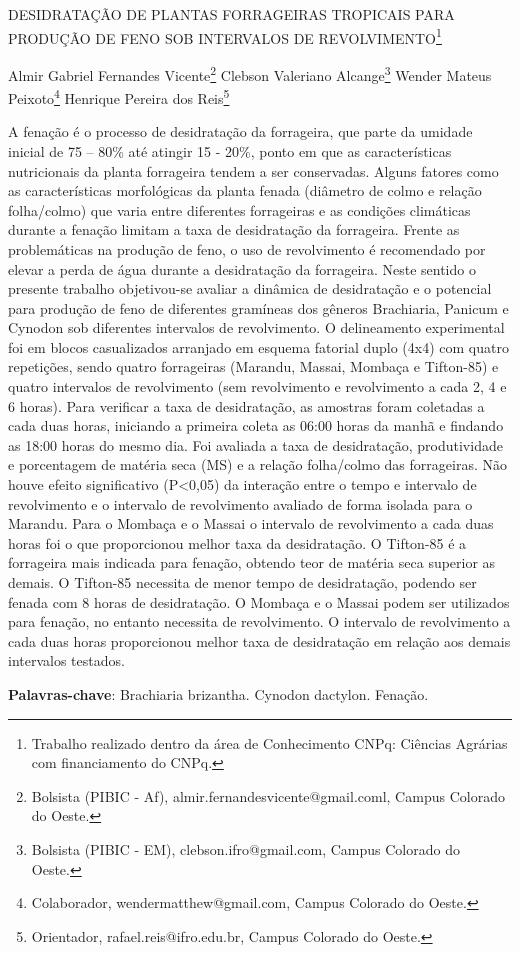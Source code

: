 \documentclass[article,12pt,onesidea,4paper,english,brazil]{abntex2}
\begin{document}
	
	
	\frenchspacing 
	
	\begin{center}
		\LARGE DESIDRATAÇÃO DE PLANTAS FORRAGEIRAS TROPICAIS PARA PRODUÇÃO DE FENO SOB INTERVALOS DE REVOLVIMENTO\footnote{Trabalho realizado dentro da área de Conhecimento CNPq: Ciências Agrárias com financiamento do CNPq.}
		
		\normalsize
		Almir Gabriel Fernandes Vicente\footnote{Bolsista (PIBIC - Af), almir.fernandesvicente@gmail.coml, Campus Colorado do Oeste.} 
	Clebson Valeriano Alcange\footnote{Bolsista (PIBIC - EM), clebson.ifro@gmail.com, Campus Colorado do Oeste.} 
		Wender Mateus Peixoto\footnote{Colaborador, wendermatthew@gmail.com, Campus Colorado do Oeste.} 
		Henrique Pereira dos Reis\footnote{Orientador, rafael.reis@ifro.edu.br, Campus Colorado do Oeste.} 
	\end{center}
	
	\noindent A fenação é o processo de desidratação da forrageira, que parte da umidade inicial de 75 – 80\% até atingir 15 - 20\%, ponto em que as características nutricionais da planta forrageira tendem a ser conservadas. Alguns fatores como as características morfológicas da planta fenada (diâmetro de colmo e relação folha/colmo) que varia entre diferentes forrageiras e as condições climáticas durante a fenação limitam a taxa de desidratação da forrageira. Frente as problemáticas na produção de feno, o uso de revolvimento é recomendado por elevar a perda de água durante a desidratação da forrageira. Neste sentido o presente trabalho objetivou-se avaliar a dinâmica de desidratação e o potencial para produção de feno de diferentes gramíneas dos gêneros Brachiaria, Panicum e Cynodon sob diferentes intervalos de revolvimento. O delineamento experimental foi em blocos casualizados arranjado em esquema fatorial duplo (4x4) com quatro repetições, sendo quatro forrageiras (Marandu, Massai, Mombaça e Tifton-85) e quatro intervalos de revolvimento (sem revolvimento e revolvimento a cada 2, 4 e 6 horas). Para verificar a taxa de desidratação, as amostras foram coletadas a cada duas horas, iniciando a primeira coleta as 06:00 horas da manhã e findando as 18:00 horas do mesmo dia. Foi avaliada a taxa de desidratação, produtividade e porcentagem de matéria seca (MS) e a relação folha/colmo das forrageiras. Não houve efeito significativo (P<0,05) da interação entre o tempo e intervalo de revolvimento e o intervalo de revolvimento avaliado de forma isolada para o Marandu. Para o Mombaça e o Massai o intervalo de revolvimento a cada duas horas foi o que proporcionou melhor taxa da desidratação. O Tifton-85 é a forrageira mais indicada para fenação, obtendo teor de matéria seca superior as demais. O Tifton-85 necessita de menor tempo de desidratação, podendo ser fenada com 8 horas de desidratação. O Mombaça e o Massai podem ser utilizados para fenação, no entanto necessita de revolvimento. O intervalo de revolvimento a cada duas horas proporcionou melhor taxa de desidratação em relação aos demais intervalos testados.
	
	\vspace{\onelineskip}
	
	\noindent
	\textbf{Palavras-chave}: Brachiaria brizantha. Cynodon dactylon. Fenação.
	
\end{document}
